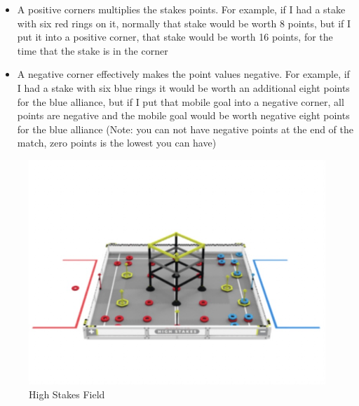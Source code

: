 {\begin{itemize}
\item A positive corners multiplies the stakes points. For example, if I had a stake with six red rings on it, normally that stake would be worth 8 points, but if I put it into a positive corner, that stake would be worth 16 points, for the time that the stake is in the corner
\item A negative corner effectively makes the point values negative. For example, if I had a stake with six blue rings it would be worth an additional eight points for the blue alliance, but if I put that mobile goal into a negative corner, all points are negative and the mobile goal would be worth negative eight points for the blue alliance (Note: you can not have negative points at the end of the match, zero points is the lowest you can have)
\end{itemize}
\begin{figure}[hbt!] %
    \begin{minipage}{.5\textwidth}
        \centering
        \includegraphics[width=.8\linewidth]{images/High Stakes Field.jpeg}
        \caption{High Stakes Field}
        \label{fig:high-stakes-field}
    \end{minipage}
    \begin{minipage}{.5\textwidth}
        \centering

\end{minipage}
\end{figure}}
